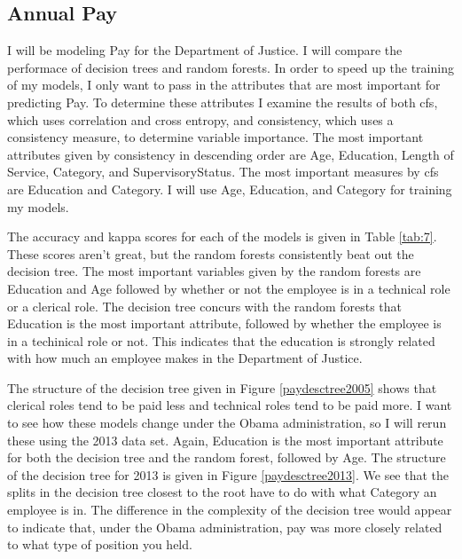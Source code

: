 \documentclass{article}
\begin{document}
    \subsection{Annual Pay}
    I will be modeling Pay for the Department of Justice. I will compare the performace of decision trees and random forests. In order to speed up the training of my models, I only want to pass in the attributes that are most important for predicting Pay. To determine these attributes I examine the results of both cfs, which uses correlation and cross entropy, and consistency, which uses a consistency measure, to determine variable importance. The most important attributes given by consistency in descending order are Age, Education, Length of Service, Category, and SupervisoryStatus. The most important measures by cfs are Education and Category. I will use Age, Education, and Category for training my models.
    \par
    The accuracy and kappa scores for each of the models is given in Table \ref{tab:7}. These scores aren't great, but the random forests consistently beat out the decision tree. The most important variables given by the random forests are Education and Age followed by whether or not the employee is in a technical role or a clerical role. The decision tree concurs with the random forests that Education is the most important attribute, followed by whether the employee is in a techinical role or not. This indicates that the education is strongly related with how much an employee makes in the Department of Justice.
    \par
    The structure of the decision tree given in Figure \ref{paydesctree2005} shows that clerical roles tend to be paid less and technical roles tend to be paid more. I want to see how these models change under the Obama administration, so I will rerun these using the 2013 data set. Again, Education is the most important attribute for both the decision tree and the random forest, followed by Age. The structure of the decision tree for 2013 is given in Figure \ref{paydesctree2013}. We see that the splits in the decision tree closest to the root have to do with what Category an employee is in. The difference in the complexity of the decision tree would appear to indicate that, under the Obama administration, pay was more closely related to what type of position you held.
\end{document}
